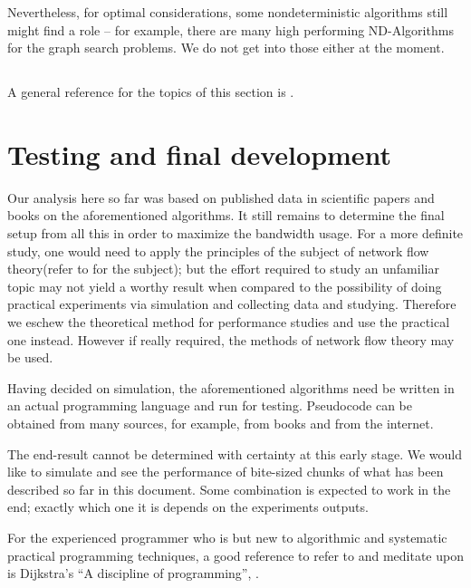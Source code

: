 \documentclass[fleqn,a4paper]{SelfArx}
\begin{document}
\par Nevertheless, for optimal considerations, some nondeterministic algorithms still might find a role -- for example, there are many high
performing ND-Algorithms for the graph search problems. We do not get into those either at the moment.

\subsection*{}

A general reference for the topics of this section is \cite{Ghosh:2007DS}.

\section{Testing and final development}

\par Our analysis here so far was based on published data in scientific papers and books on the aforementioned algorithms. It still remains
to determine the final setup from all this in order to maximize the bandwidth usage. For a more definite study, one would need to apply
the principles of the subject of network flow theory(refer to \cite{Ford:62Fulkerson} for the subject); but the effort required to study
an unfamiliar topic may not yield a worthy result when compared to the possibility of doing practical experiments via simulation and collecting 
data and studying.
Therefore we eschew the theoretical method for performance studies and use the practical one instead. However if really required, the 
methods of network flow theory may be used.

\par Having decided on simulation, the aforementioned algorithms need be written in an actual programming language and run for testing. 
Pseudocode can be obtained from many
sources, for example, from books and from the internet. 

\par The end-result cannot be determined with certainty at this early stage. We would like to simulate and see the performance of bite-sized
chunks of what has been described so far in this document. Some combination is expected to work in the end; exactly which one it is depends
on the experiments outputs.

\par For the experienced programmer who is but new to algorithmic and systematic practical programming techniques,
a good reference to refer to and meditate upon is Dijkstra's ``A discipline of programming'', \cite{Dijkstra:75Discipline}. 
\end{document}
